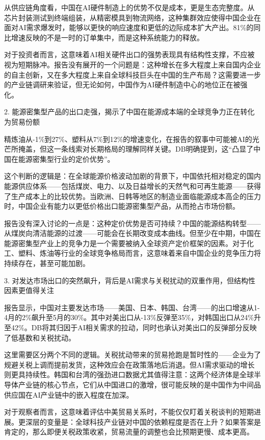 \documentclass[11pt]{ctexart}
\begin{document}
从供应链角度看，中国在AI硬件制造上的优势不仅是成本，更是生态完整度。从芯片封装测试到终端组装，从精密模具到物流网络，这种集群效应使得中国企业在面对AI需求爆发时，能够以更快的响应速度和更低的边际成本扩大产出。81\%的同比增速反映的不是一时的订单集中，而是这种系统能力的释放。

对于投资者而言，这意味着AI相关硬件出口的强势表现具有结构性支撑，不应被视为短期脉冲。报告没有展开的一个问题是：这种增长在多大程度上来自国内企业的自主创新，又在多大程度上来自全球科技巨头在中国的生产布局？这需要进一步的产业链调研来验证，但无论如何，中国作为AI硬件制造中心的地位正在被强化。

2. 能源密集型产品的出口走强，揭示了中国在能源成本端的全球竞争力正在转化为贸易份额

精炼油从-1\%到27\%、塑料从7\%到12\%的增速变化，在报告的叙事中可能被AI的光芒所掩盖，但这一条线索对长期格局的理解同样关键。DB明确提到，这“凸显了中国在能源密集型行业的定价优势”。

这个判断的逻辑是：在全球能源价格波动加剧的背景下，中国依托相对稳定的国内能源供应体系——包括煤炭、电力、以及日益增长的天然气和可再生能源——获得了生产成本上的比较优势。当欧洲、日韩等地区的制造业面临能源成本高企的压力时，中国企业有能力以更低价格出口能源密集型产品，从而抢占市场份额。

报告没有深入讨论的一点是：这种定价优势是否可持续？中国的能源结构转型——从煤炭向清洁能源的过渡——可能会在长期改变成本曲线。但至少在中期，中国在能源密集型产业上的竞争力是一个需要被纳入全球资产定价框架的因素。对于化工、塑料、炼油等行业的全球竞争格局而言，这意味着来自中国企业的竞争压力将持续存在，甚至可能加剧。

3. 对发达市场出口的突然飙升，背后是AI需求与关税扰动的双重作用，但结构性因素更值得关注

报告显示，中国对主要发达市场——美国、日本、韩国、台湾——的出口增速从1-4月的2\%飙升至5月的30\%。其中对美出口从-13\%反弹至35\%，对韩国出口从24\%升至42\%。DB将其归因于AI相关需求的拉动，同时也承认对美出口的反弹部分反映了低基数和关税扰动。

这里需要区分两个不同的逻辑。关税扰动带来的贸易抢跑是暂时性的——企业为了规避关税上调而提前发货，这种效应会在政策落地后消退。但AI需求驱动的增长则更具持续性。韩国和台湾的强劲进口数据尤其值得注意：这两个经济体是全球半导体产业链的核心节点，它们从中国进口的激增，很可能反映的是中国作为中间品供应国在AI产业链中的嵌入程度在加深。

对于观察者而言，这意味着评估中美贸易关系时，不能仅仅盯着关税谈判的短期进展。更深层的变量是：全球科技产业链对中国的依赖程度是否在上升？如果答案是肯定的，那么即便关税政策收紧，贸易流量的调整也会比预期更慢、成本更高。
\end{document}
